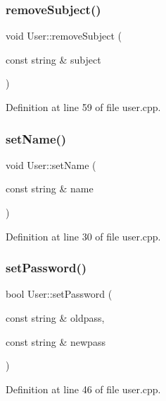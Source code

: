 \subsubsection{\texorpdfstring{remove\+Subject()}{removeSubject()}}
{\footnotesize\ttfamily void User\+::remove\+Subject (\begin{DoxyParamCaption}\item[{const string \&}]{subject }\end{DoxyParamCaption})}



Definition at line 59 of file user.\+cpp.

\mbox{\label{class_user_a76273e1ada631144d57fc2173c9100aa}} 
\subsubsection{\texorpdfstring{set\+Name()}{setName()}}
{\footnotesize\ttfamily void User\+::set\+Name (\begin{DoxyParamCaption}\item[{const string \&}]{name }\end{DoxyParamCaption})}



Definition at line 30 of file user.\+cpp.

\mbox{\label{class_user_ab31250ec7220ae7832cf20a13308457f}} 
\subsubsection{\texorpdfstring{set\+Password()}{setPassword()}}
{\footnotesize\ttfamily bool User\+::set\+Password (\begin{DoxyParamCaption}\item[{const string \&}]{oldpass,  }\item[{const string \&}]{newpass }\end{DoxyParamCaption})}



Definition at line 46 of file user.\+cpp.

\mbox{\label{class_user_aa800167b7d7c5d342af15a0ba01a7ee4}} 
